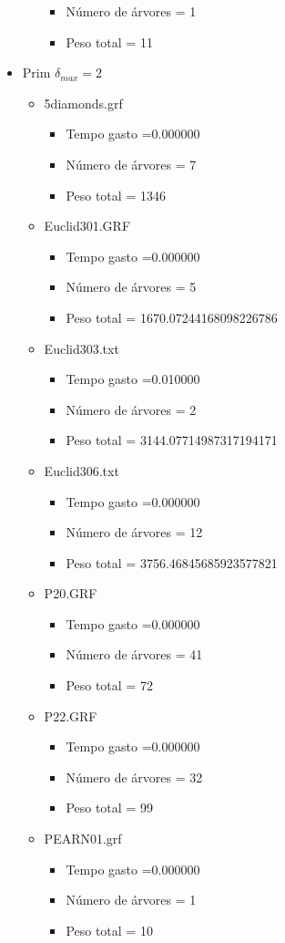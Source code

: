 \begin{itemize}
\begin{itemize}
\begin{itemize}
\item Número de árvores = 1
\item Peso total = 11
\end{itemize}
\end{itemize}
\item Prim $\delta_{max}=2$
\begin{itemize}
\item 5diamonds.grf
\begin{itemize}
\item Tempo gasto =0.000000
\item Número de árvores = 7
\item Peso total = 1346
\end{itemize}
\item Euclid301.GRF
\begin{itemize}
\item Tempo gasto =0.000000
\item Número de árvores = 5
\item Peso total = 1670.07244168098226786
\end{itemize}
\item Euclid303.txt
\begin{itemize}
\item Tempo gasto =0.010000
\item Número de árvores = 2
\item Peso total = 3144.07714987317194171
\end{itemize}
\item Euclid306.txt
\begin{itemize}
\item Tempo gasto =0.000000
\item Número de árvores = 12
\item Peso total = 3756.46845685923577821
\end{itemize}
\item P20.GRF
\begin{itemize}
\item Tempo gasto =0.000000
\item Número de árvores = 41
\item Peso total = 72
\end{itemize}
\item P22.GRF
\begin{itemize}
\item Tempo gasto =0.000000
\item Número de árvores = 32
\item Peso total = 99
\end{itemize}
\item PEARN01.grf
\begin{itemize}
\item Tempo gasto =0.000000
\item Número de árvores = 1
\item Peso total = 10
\end{itemize}
\end{itemize}
\end{itemize}
